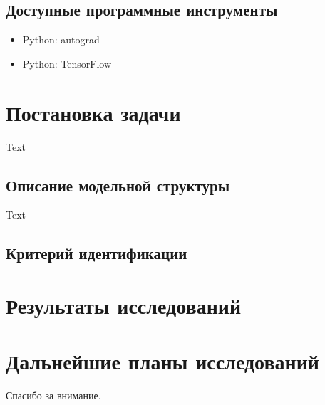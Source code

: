 \documentclass{beamer}
\begin{document}
\subsection{Доступные программные инструменты}

\begin{frame}{\secname}{\subsecname}
	\begin{itemize}
		\item Python: autograd 
		\item Python: TensorFlow
	\end{itemize}
\end{frame}


\section{Постановка задачи}

\begin{frame}{\secname}
  Text
\end{frame}


\subsection{Описание модельной структуры}

\begin{frame}{\secname}{\subsecname}
  Text
\end{frame}


\subsection{Критерий идентификации}

\section{Результаты исследований}

\section{Дальнейшие планы исследований}

\begin{frame}
\begin{center}
  \LARGE{Спасибо за внимание.}
\end{center}
\end{frame}

\frame{\titlepage}
\end{document}
